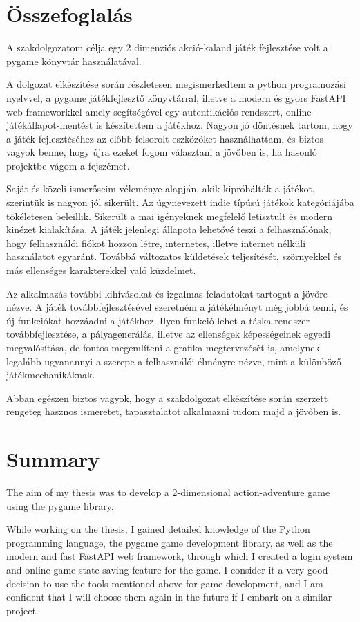 \chapter{Összefoglalás}

\indent \indent A szakdolgozatom célja egy 2 dimenziós akció-kaland játék fejlesztése volt a pygame könyvtár használatával.

A dolgozat elkészítése során részletesen megismerkedtem a python programozási nyelvvel, a pygame játékfejlesztő könyvtárral, illetve a modern és gyors FastAPI web frameworkkel amely segítségével egy autentikációs rendszert, online játékállapot-mentést is készítettem a játékhoz. Nagyon jó döntésnek tartom, hogy a játék fejlesztéséhez az előbb felsorolt eszközöket használhattam, és biztos vagyok benne, hogy újra ezeket fogom választani a jövőben is, ha hasonló projektbe vágom a fejszémet.

Saját és közeli ismerőseim véleménye alapján, akik kipróbálták a játékot, szerintük is nagyon jól sikerült. Az úgynevezett indie típúsú játékok kategóriájába tökéletesen beleillik. Sikerült a mai igényeknek megfelelő letisztult és modern kinézet kialakítása. A játék jelenlegi állapota lehetővé teszi a felhasználónak, hogy felhasználói fiókot hozzon létre, internetes, illetve internet nélküli használatot egyaránt. Továbbá változatos küldetések teljesítését, szörnyekkel és más ellenséges karakterekkel való küzdelmet.

Az alkalmazás további kihívásokat és izgalmas feladatokat tartogat a jövőre nézve. A játék továbbfejlesztésével szeretném a játékélményt még jobbá tenni, és új funkciókat hozzáadni a játékhoz. Ilyen funkció lehet a táska rendszer továbbfejlesztése, a pályagenerálás, illetve az ellenségek képességeinek egyedi megvalósítása, de fontos megemlíteni a grafika megtervezését is, amelynek legalább ugyanannyi a szerepe a felhasználói élményre nézve, mint a különböző játékmechanikáknak.  

Abban egészen biztos vagyok, hogy a szakdolgozat elkészítése során szerzett rengeteg hasznos ismeretet, tapasztalatot alkalmazni tudom majd a jövőben is.

\chapter{Summary}

\indent \indent The aim of my thesis was to develop a 2-dimensional action-adventure game using the pygame library.

While working on the thesis, I gained detailed knowledge of the Python programming language, the pygame game development library, as well as the modern and fast FastAPI web framework, through which I created a login system and online game state saving feature for the game. I consider it a very good decision to use the tools mentioned above for game development, and I am confident that I will choose them again in the future if I embark on a similar project.

